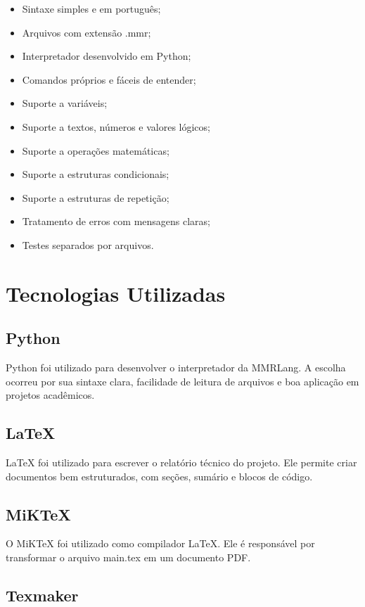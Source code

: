 \documentclass[12pt,a4paper]{article}
\begin{document}
\begin{itemize}
\item Sintaxe simples e em português;
\item Arquivos com extensão .mmr;
\item Interpretador desenvolvido em Python;
\item Comandos próprios e fáceis de entender;
\item Suporte a variáveis;
\item Suporte a textos, números e valores lógicos;
\item Suporte a operações matemáticas;
\item Suporte a estruturas condicionais;
\item Suporte a estruturas de repetição;
\item Tratamento de erros com mensagens claras;
\item Testes separados por arquivos.
\end{itemize}

\section{Tecnologias Utilizadas}

\subsection{Python}

Python foi utilizado para desenvolver o interpretador da MMRLang. A escolha ocorreu por sua sintaxe clara, facilidade de leitura de arquivos e boa aplicação em projetos acadêmicos.

\subsection{LaTeX}

LaTeX foi utilizado para escrever o relatório técnico do projeto. Ele permite criar documentos bem estruturados, com seções, sumário e blocos de código.

\subsection{MiKTeX}

O MiKTeX foi utilizado como compilador LaTeX. Ele é responsável por transformar o arquivo main.tex em um documento PDF.

\subsection{Texmaker}
\end{document}
